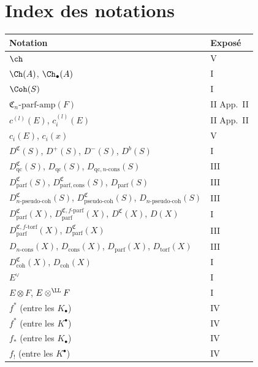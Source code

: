 \newpage
\section*{Index des notations}

\begin{longtable}{p{7cm}l}
\toprule
\textbf{Notation} & \textbf{Expos\'e} \\
\midrule
\endhead

$\ch$ & V \\
$\Ch(A)$, $\Ch_{\bullet}(A)$ & I \\
$\Coh(S)$ & I \\
$\mathfrak{C}_n$-$\mathrm{parf\text{-}amp}(F)$ & II App.\ II \\
$c^{(l)}(E)$, $c_i^{(l)}(E)$ & II App.\ II \\
$c_i(E)$, $c_i(x)$ & V \\
$D^{\mathfrak{C}}(S)$, $D^{+}(S)$, $D^{-}(S)$, $D^{b}(S)$ & I \\
$D^{\mathfrak{C}}_{\mathrm{qc}}(S)$, $D_{\mathrm{qc}}(S)$, $D_{\mathrm{qc}, n\text{-}\mathrm{cons}}(S)$ & III \\
$D^{\mathfrak{C}}_{\mathrm{parf}}(S)$, $D^{\mathfrak{C}}_{\mathrm{parf, cons}}(S)$, $D_{\mathrm{parf}}(S)$ & III \\
$D^{\mathfrak{C}}_{n\text{-}\mathrm{pseudo\text{-}coh}}(S)$, $D^{\mathfrak{C}}_{\mathrm{pseudo\text{-}coh}}(S)$, $D_{n\text{-}\mathrm{pseudo\text{-}coh}}(S)$ & III \\
$D_{\mathrm{parf}}^{\mathfrak{C}}(X)$, $D_{\mathrm{parf}}^{\mathfrak{C}, f\text{-}\mathrm{parf}}(X)$, $D^{\mathfrak{C}}(X)$, $D(X)$ & I \\
$D_{\mathrm{parf}}^{\mathfrak{C}, f\text{-}\mathrm{torf}}(X)$, $D_{\mathrm{parf}}^{\mathfrak{C}}(X)$ & III \\
$D_{n\text{-}\mathrm{cons}}(X)$, $D_{\mathrm{cons}}(X)$, $D_{\mathrm{parf}}(X)$, $D_{\mathrm{torf}}(X)$ & III \\
$D_{\mathrm{coh}}^{\mathfrak{C}}(X)$, $D_{\mathrm{coh}}(X)$ & I \\
$E^{\vee}$ & I \\
$E \otimes F$, $E \otimes^{\LL} F$ & I \\
$f^{*}$ (entre les $K_{\bullet}$) & IV \\
$f^{*}$ (entre les $K^{\bullet}$) & IV \\
$f_{*}$ (entre les $K_{\bullet}$) & IV \\
$f_{!}$ (entre les $K^{\bullet}$) & IV \\

\end{longtable}
